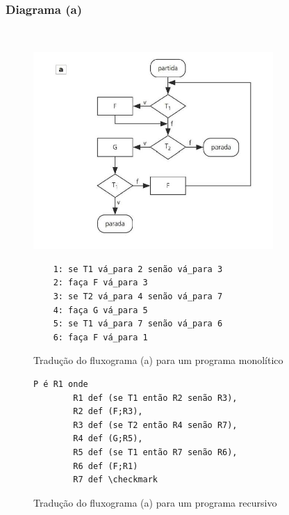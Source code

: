 \documentclass[12pt,fleqn]{article}
\begin{document}
\subsubsection{Diagrama (a)}
~
\begin{figure}[H]
    \centering
    \includegraphics[height=7.5cm]{img/diagrama_a}
\end{figure}
%
\begin{figure}[H]
\begin{verbatim}
    1: se T1 vá_para 2 senão vá_para 3
    2: faça F vá_para 3
    3: se T2 vá_para 4 senão vá_para 7
    4: faça G vá_para 5
    5: se T1 vá_para 7 senão vá_para 6
    6: faça F vá_para 1
\end{verbatim}
\caption{Tradução do fluxograma (a) para um programa monolítico}
\end{figure}
%
\begin{figure}[H]
\begin{Verbatim}[commandchars=\\\{\},codes={\catcode`\$=3\catcode`\^=7}]
    P é R1 onde
        R1 def (se T1 então R2 senão R3),
        R2 def (F;R3),
        R3 def (se T2 então R4 senão R7),
        R4 def (G;R5),
        R5 def (se T1 então R7 senão R6),
        R6 def (F;R1)
        R7 def \checkmark
\end{Verbatim}
\caption{Tradução do fluxograma (a) para um programa recursivo}
\end{figure}

\newpage
\end{document}
